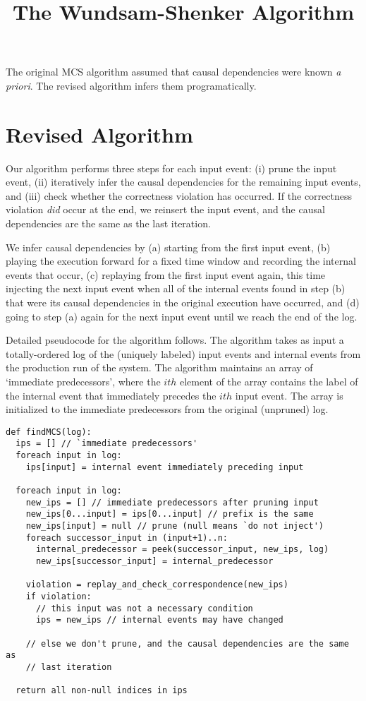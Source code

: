 \documentclass[10pt,a4paper,titlepage]{article}
\newcommand{\apriori}{{\it a priori}}
\begin{document}
\title{The Wundsam-Shenker Algorithm\textsuperscript{\texttrademark}}
  \date{}
  \maketitle{}

The original MCS algorithm assumed that causal dependencies were known
\apriori. The revised algorithm infers them programatically.

\section*{Revised Algorithm}

Our algorithm performs three steps for each input event:
(i) prune the input event, (ii) iteratively infer the causal dependencies for the
remaining input events, and (iii) check whether the correctness violation has occurred. If
the correctness violation {\it did} occur at the end, we reinsert the input event, and the causal
dependencies are the same as the last iteration.

We infer causal dependencies by (a) starting from the first input event, (b)
playing the execution forward for a fixed time window and recording the internal events
that occur, (c) replaying from the first input event again, this time injecting
the next input event when all of the internal events found in step (b) that
were its causal dependencies in the original execution have occurred, and (d)
going to step (a) again for the next input event until we reach the end of
the log.

Detailed pseudocode for the algorithm follows. The algorithm takes as input a
totally-ordered log of the (uniquely labeled) input events and internal events from the production run
of the system. The algorithm maintains an array of `immediate predecessors', where the
$ith$ element of the array contains the label of the internal event that
immediately precedes the $ith$ input event. The array is initialized to the immediate
predecessors from the original (unpruned) log.

\begin{verbatim}
def findMCS(log):
  ips = [] // `immediate predecessors'
  foreach input in log:
    ips[input] = internal event immediately preceding input
  
  foreach input in log:
    new_ips = [] // immediate predecessors after pruning input
    new_ips[0...input] = ips[0...input] // prefix is the same
    new_ips[input] = null // prune (null means `do not inject')
    foreach successor_input in (input+1)..n:
      internal_predecessor = peek(successor_input, new_ips, log)
      new_ips[successor_input] = internal_predecessor
    
    violation = replay_and_check_correspondence(new_ips)
    if violation:
      // this input was not a necessary condition
      ips = new_ips // internal events may have changed

    // else we don't prune, and the causal dependencies are the same as
    // last iteration
  
  return all non-null indices in ips
\end{verbatim}
\end{document}
